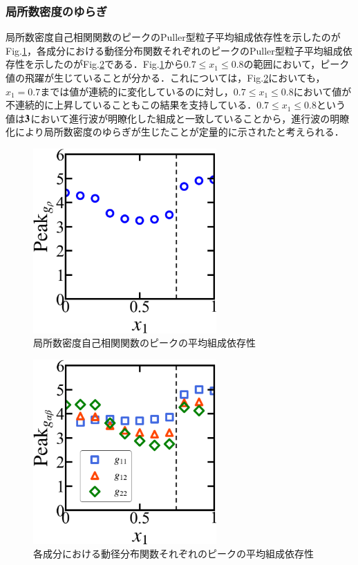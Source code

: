 \documentclass[11pt,a4j]{jarticle}
\begin{document}
\subsubsection{局所数密度のゆらぎ}
\par 局所数密度自己相関関数のピークのPuller型粒子平均組成依存性を示したのがFig.\ref{Rho_yuragi}，各成分における動径分布関数それぞれのピークのPuller型粒子平均組成依存性を示したのがFig.\ref{gab}である．Fig.\ref{Rho_yuragi}から$0.7\le x_1 \le 0.8$の範囲において，ピーク値の飛躍が生じていることが分かる．これについては，Fig.\ref{gab}においても，$x_1=0.7$までは値が連続的に変化しているのに対し，$0.7\le x_1 \le 0.8$において値が不連続的に上昇していることもこの結果を支持している．$0.7\le x_1 \le 0.8$という値は$\bf 3$において進行波が明瞭化した組成と一致していることから，進行波の明瞭化により局所数密度のゆらぎが生じたことが定量的に示されたと考えられる．
\vspace*{8truemm}
\begin{figure}[h]
\begin{center}
\includegraphics[width=70mm]{./images/Peak_rho.png}
\caption{局所数密度自己相関関数のピークの平均組成依存性}
\label{Rho_yuragi}
\vspace{0truemm}
\end{center}
\end{figure}
\vspace*{5truemm}
\begin{figure}[h]
\begin{center}
\includegraphics[width=70mm]{./images/Peak_g.png}
\caption{各成分における動径分布関数それぞれのピークの平均組成依存性}
\label{gab}
\vspace{0truemm}
\end{center}
\end{figure}
\newpage
\end{document}
